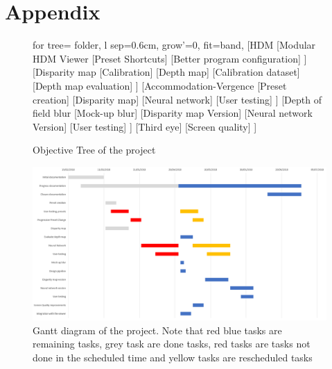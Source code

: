 \documentclass[10pt,a4paper,twocolumn,twoside]{article}
\begin{document}
	
	
	
	\appendix
	
	\section*{Appendix}
	\begin{figure}
		\begin{forest}
			for tree={%
				folder,
				l sep=0.6cm,
				grow'=0,
				fit=band,
			}
			[HDM
			[Modular HDM Viewer
			[Preset Shortcuts]
			[Better program configuration]
			]
			[Disparity map
			[Calibration]
			[Depth map]
			[Calibration dataset]
			[Depth map evaluation]
			]
			[Accommodation-Vergence
			[Preset creation]
			[Disparity map]
			[Neural network]
			[User testing]
			]
			[Depth of field blur
			[Mock-up blur]
			[Disparity map Version]
			[Neural network Version]
			[User testing]
			]
			[Third eye]
			[Screen quality]
			]
		\end{forest}
		\caption{Objective Tree of the project}	
		\label{fig:objective}
	\end{figure}
	
	\begin{landscape}
		\begin{figure}
			\centering
			\includegraphics[width=1\linewidth]{img/gantt2}
			\caption{Gantt diagram of the project. Note that red blue tasks are remaining tasks, grey task are done tasks, red tasks are tasks not done in the scheduled time and yellow tasks are rescheduled tasks }
			\label{fig:gantt}
		\end{figure}
		
	\end{landscape}
	
	
	
	
\end{document}
